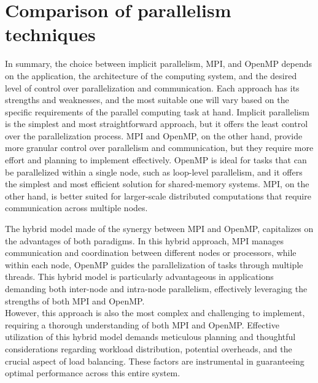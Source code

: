 \section*{\label{sec:comparison}Comparison of parallelism techniques}

In summary, the choice between implicit parallelism, MPI, and OpenMP depends on %
the application, the architecture of the computing system, and the desired level %
of control over parallelization and communication. Each approach has its strengths %
and weaknesses, and the most suitable one will vary based on the specific requirements %
of the parallel computing task at hand.
Implicit parallelism is the simplest and most straightforward approach, but it %
offers the least control over the parallelization process. MPI and OpenMP, on the %
other hand, provide more granular control over parallelism and communication, %
but they require more effort and planning to implement effectively.
OpenMP is ideal for tasks that can be parallelized within a single node, such as %
loop-level parallelism, and it offers the simplest and most efficient solution %
for shared-memory systems. MPI, on the other hand, is better suited for larger-scale %
distributed computations that require communication across multiple nodes.

The hybrid model made of the synergy between MPI and OpenMP, capitalizes on the advantages of both paradigms. %
In this hybrid approach, MPI manages communication and coordination between different nodes or processors, %
while within each node, OpenMP guides the parallelization of tasks through multiple threads. This hybrid model %
is particularly advantageous in applications demanding both inter-node and intra-node parallelism, effectively %
leveraging the strengths of both MPI and OpenMP. \\
However, this approach is also the most complex and challenging to implement, requiring a thorough understanding %
of both MPI and OpenMP. Effective utilization of this hybrid model demands meticulous planning and thoughtful %
considerations regarding workload distribution, potential overheads, and the crucial aspect of load balancing. %
These factors are instrumental in guaranteeing optimal performance across this entire system.

